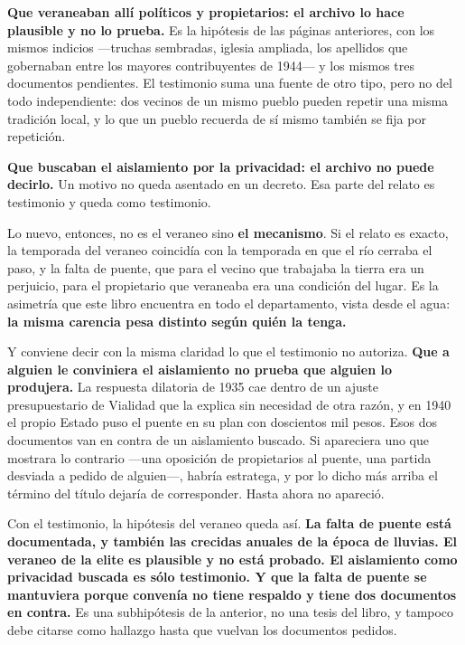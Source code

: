 \textbf{Que veraneaban allí políticos y propietarios: el archivo lo hace plausible y no lo
prueba.} Es la hipótesis de las páginas anteriores, con los mismos indicios ---truchas
sembradas, iglesia ampliada, los apellidos que gobernaban entre los mayores contribuyentes de
1944--- y los mismos tres documentos pendientes. El testimonio suma una fuente de otro tipo,
pero no del todo independiente: dos vecinos de un mismo pueblo pueden repetir una misma
tradición local, y lo que un pueblo recuerda de sí mismo también se fija por repetición.

\textbf{Que buscaban el aislamiento por la privacidad: el archivo no puede decirlo.} Un motivo
no queda asentado en un decreto. Esa parte del relato es testimonio y queda como testimonio.

Lo nuevo, entonces, no es el veraneo sino \textbf{el mecanismo}. Si el relato es exacto, la
temporada del veraneo coincidía con la temporada en que el río cerraba el paso, y la falta de
puente, que para el vecino que trabajaba la tierra era un perjuicio, para el propietario que
veraneaba era una condición del lugar. Es la asimetría que este libro encuentra en todo el
departamento, vista desde el agua: \textbf{la misma carencia pesa distinto según quién la
tenga.}

Y conviene decir con la misma claridad lo que el testimonio no autoriza. \textbf{Que a alguien
le conviniera el aislamiento no prueba que alguien lo produjera.} La respuesta dilatoria de
1935 cae dentro de un ajuste presupuestario de Vialidad que la explica sin necesidad de otra
razón, y en 1940 el propio Estado puso el puente en su plan con doscientos mil pesos. Esos dos
documentos van en contra de un aislamiento buscado. Si apareciera uno que mostrara lo
contrario ---una oposición de propietarios al puente, una partida desviada a pedido de
alguien---, habría estratega, y por lo dicho más arriba el término del título dejaría de
corresponder. Hasta ahora no apareció.

\begin{cautela}
Con el testimonio, la hipótesis del veraneo queda así. \textbf{La falta de puente está
documentada, y también las crecidas anuales de la época de lluvias. El veraneo de la elite es
plausible y no está probado. El aislamiento como privacidad buscada es sólo testimonio. Y que la
falta de puente se mantuviera porque convenía no tiene respaldo y tiene dos documentos en
contra.} Es una subhipótesis de la anterior, no una tesis del libro, y tampoco debe citarse como
hallazgo hasta que vuelvan los documentos pedidos.
\end{cautela}




